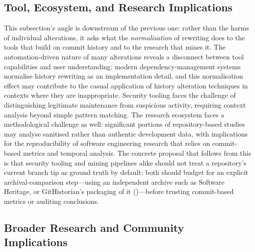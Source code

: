 \subsection{Tool, Ecosystem, and Research Implications}
\label{subsec:hist-disc-auditing}

This subsection's angle is downstream of the previous one: rather than the harms of individual alterations, it asks what the \emph{normalisation} of rewriting does to the tools that build on commit history and to the research that mines it.
The automation-driven nature of many alterations reveals a disconnect between tool capabilities and user understanding: modern dependency-management systems normalise history rewriting as an implementation detail, and this normalisation effect may contribute to the casual application of history alteration techniques in contexts where they are inappropriate.
Security tooling faces the challenge of distinguishing legitimate maintenance from suspicious activity, requiring context analysis beyond simple pattern matching.
The research ecosystem faces a methodological challenge as well: significant portions of repository-based studies may analyse sanitised rather than authentic development data, with implications for the reproducibility of software engineering research that relies on commit-based metrics and temporal analysis.
The concrete proposal that follows from this is that security tooling and mining pipelines alike should not treat a repository's current branch tip as ground truth by default: both should budget for an explicit archival-comparison step---using an independent archive such as Software Heritage, or GitHistorian's packaging of it ()---before trusting commit-based metrics or auditing conclusions.

\subsection{Broader Research and Community Implications}
\label{subsec:hist-disc-research}

